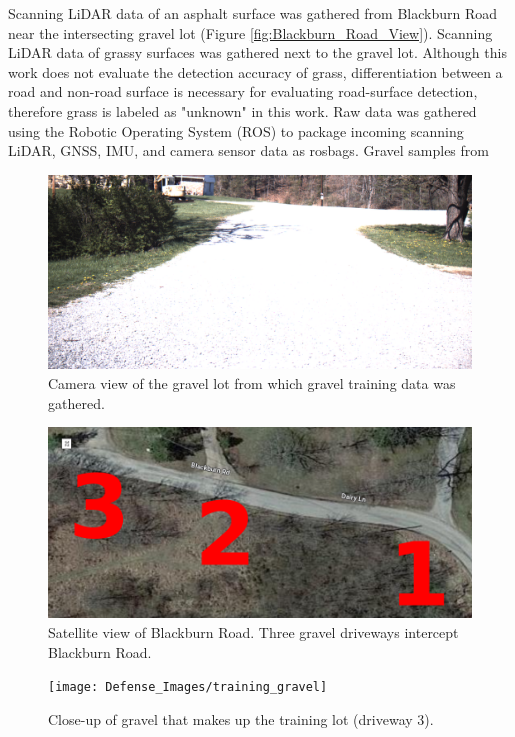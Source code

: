 \documentclass[numbered,pdftex]{ohio-etd}
\begin{document}
{{{{{					Scanning LiDAR data of an asphalt surface was gathered from Blackburn Road near the intersecting gravel lot (Figure \ref{fig:Blackburn_Road_View}). Scanning LiDAR data of grassy surfaces was gathered next to the gravel lot. Although this work does not evaluate the detection accuracy of grass, differentiation between a road and non-road surface is necessary for evaluating road-surface detection, therefore grass is labeled as "unknown" in this work. Raw data was gathered using the Robotic Operating System (ROS) to package incoming scanning LiDAR, GNSS, IMU, and camera sensor data as rosbags.  Gravel samples from }
				
				\begin{figure}[H]
					\centering
					\includegraphics[width=0.75\linewidth]{Defense_Images/gravel_training_lot}
					\caption[Gravel Training Lot]{Camera view of the gravel lot from which gravel training data was gathered.}
					\label{fig:gravel_training_lot}
				\end{figure}
				
				\begin{figure}[H]
					\centering
					\includegraphics[width=0.75\linewidth]{Defense_Images/three_driveways_sat}
					\caption[Satellite View of Blackburn Road]{Satellite view of Blackburn Road. Three gravel driveways intercept Blackburn Road. }
					\label{fig:three_driveways_sat}
				\end{figure}
				
				\begin{figure}[H]
					\centering
					\texttt{[image: Defense\_Images/training\_gravel]}
					\caption[Training Gravel]{Close-up of gravel that makes up the training lot (driveway 3).}
					\label{fig:training_gravel}
				\end{figure}
				
}}}}
\end{document}
